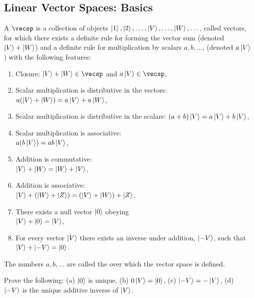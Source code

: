 \subsection{Linear Vector Spaces: Basics}

\begin{shaded*}
A  $\vecsp$ is a collection of objects $\ket{1}, \ket{2}, \dots, \ket{V}, \dots, \ket{W}, \dots$, called vectors, for which there exists a definite rule for forming the vector sum (denoted $\ket{V} + \ket{W}$) and a definite rule for multiplication by scalars $a, b, \dots$, (denoted $a\ket{V}$) with the following features:
    \begin{enumerate}
        \item Closure: $\ket{V} + \ket{W} \in \vecsp$ and $a\ket{V} \in \vecsp$,
        \item Scalar multiplication is distributive in the vectors: $a(\ket{V} + \ket{W}) = a\ket{V} + a\ket{W}$,
        \item Scalar multiplication is distributive in the scalars: $(a + b)\ket{V} = a\ket{V} + b\ket{V}$,
        \item Scalar multiplication is associative: \\$a(b\ket{V}) = ab\ket{V}$,
        \item Addition is commutative: \\$\ket{V} + \ket{W} = \ket{W} + \ket{V}$,
        \item Addition is associative: \\$\ket{V} + (\ket{W} + \ket{Z}) = (\ket{V} + \ket{W}) + \ket{Z}$,
        \item There exists a null vector $\ket{0}$ obeying \\$\ket{V} + \ket{0} = \ket{V}$,
        \item For every vector $\ket{V}$ there exists an inverse under addition, $\ket{-V}$, such that \\$\ket{V} + \ket{-V} = \ket{0}$.
    \end{enumerate}
\end{shaded*}


The numbers $a, b, \dots$ are called the  over which the vector space is defined.

\begin{exercise}
Prove the following: (a) $\ket{0}$ is unique, (b) $0\ket{V} = \ket{0}$, (c) $\ket{-V} = -\ket{V}$, (d) $\ket{-V}$ is the unique additive inverse of $\ket{V}$.
\end{exercise}

